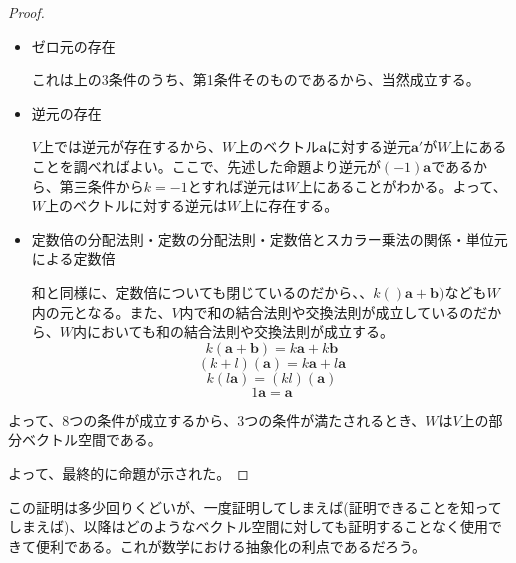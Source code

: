\begin{proof}
\begin{itemize}
		\item ゼロ元の存在

		      これは上の3条件のうち、第1条件そのものであるから、当然成立する。

		\item 逆元の存在

		      \(V\)上では逆元が存在するから、\(W\)上のベクトル\(\boldsymbol{a}\)に対する逆元\(\boldsymbol{a}'\)が\(W\)上にあることを調べればよい。ここで、先述した命題より逆元が\((-1)\boldsymbol{a}\)であるから、第三条件から\(k=-1\)とすれば逆元は\(W\)上にあることがわかる。よって、\(W\)上のベクトルに対する逆元は\(W\)上に存在する。

		\item 定数倍の分配法則・定数の分配法則・定数倍とスカラー乗法の関係・単位元による定数倍

		      和と同様に、定数倍についても閉じているのだから、、\(k()\boldsymbol{a}+\boldsymbol{b})\)なども\(W\)内の元となる。また、\(V\)内で和の結合法則や交換法則が成立しているのだから、\(W\)内においても和の結合法則や交換法則が成立する。
		      \begin{equation}
			      k(\boldsymbol{a}+\boldsymbol{b})=
			      k\boldsymbol{a}+k\boldsymbol{b}
		      \end{equation}
		      \begin{equation}
			      (k+l)(\boldsymbol{a})=
			      k\boldsymbol{a}+l\boldsymbol{a}
		      \end{equation}
		      \begin{equation}
			      k(l\boldsymbol{a})=(kl)(\boldsymbol{a})
		      \end{equation}
		      \begin{equation}
			      1\boldsymbol{a}=\boldsymbol{a}
		      \end{equation}
	\end{itemize}
	よって、8つの条件が成立するから、3つの条件が満たされるとき、\(W\)は\(V\)上の部分ベクトル空間である。

	よって、最終的に命題が示された。
\end{proof}

この証明は多少回りくどいが、一度証明してしまえば(証明できることを知ってしまえば)、以降はどのようなベクトル空間に対しても証明することなく使用できて便利である。これが数学における抽象化の利点であるだろう。

